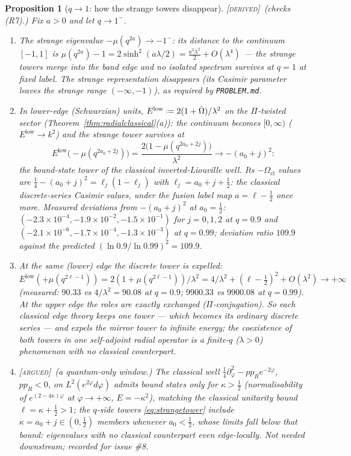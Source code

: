 \documentclass[11pt,a4paper]{article}
\providecommand{\coloneqq}{\mathrel{\vcenter{\baselineskip0.5ex \lineskiplimit0pt
      \hbox{\scriptsize.}\hbox{\scriptsize.}}}=}
\newcommand{\DERIVED}{{\color{teal}\textsc{[derived]}}}
\newcommand{\ARGUED}{{\color{orange}\textsc{[argued]}}}
\theoremstyle{definition}
\theoremstyle{plain}
\newtheorem{proposition}[definition]{Proposition}
\newcommand{\Cas}{\Omega}                       %
\newcommand{\tCas}{\tilde\Omega}                %
\begin{document}
\begin{proposition}[$q\to1$: how the strange towers disappear]\label{prop:radialq1}
\DERIVED\ (checks (R7).) Fix $a>0$ and let $q\to1^{-}$.
\begin{enumerate}[label=(\roman*)]
\item The strange eigenvalue $-\mu(q^{2a})\to-1^{-}$: its distance to the continuum
$[-1,1]$ is $\mu(q^{2a})-1=2\sinh^{2}(a\lambda/2)=\tfrac{a^{2}\lambda^{2}}{2}+O(\lambda^{4})$
--- the strange towers merge into the band edge and no isolated spectrum survives at $q=1$
at fixed label. The strange \emph{representation} disappears (its Casimir parameter leaves
the strange range $(-\infty,-1)$), as required by \texttt{PROBLEM.md}.
\item In lower-edge (Schwarzian) units, $E^{\mathrm{low}}\coloneqq2(1+\tCas)/\lambda^{2}$
on the $\Pi$-twisted sector (Theorem~\ref{thm:radialclassical}(a)): the continuum becomes
$[0,\infty)$ ($E^{\mathrm{low}}\to k^{2}$) and the strange tower survives at
\begin{equation}\label{eq:strangetower}
  E^{\mathrm{low}}\bigl(-\mu(q^{2a_{0}+2j})\bigr)
  =\frac{2\bigl(1-\mu(q^{2a_{0}+2j})\bigr)}{\lambda^{2}}
  \longrightarrow -(a_{0}+j)^{2}:
\end{equation}
the bound-state tower of the classical inverted-Liouville well. Its $-\Cas_{\mathrm{cl}}$
values are $\tfrac14-(a_{0}+j)^{2}=\ell_j(1-\ell_j)$ with $\ell_j=a_{0}+j+\tfrac12$: the
\emph{classical discrete-series} Casimir values, under the fusion label map
$a=\ell-\tfrac12$ once more. Measured deviations from $-(a_{0}+j)^{2}$ at
$a_{0}=\tfrac12$: $(-2.3\times10^{-4},-1.9\times10^{-2},-1.5\times10^{-1})$ for $j=0,1,2$
at $q=0.9$ and $(-2.1\times10^{-6},-1.7\times10^{-4},-1.3\times10^{-3})$ at $q=0.99$;
deviation ratio $109.9$ against the predicted $(\ln0.9/\ln0.99)^{2}=109.9$.
\item At the same (lower) edge the \emph{discrete} tower is expelled:
$E^{\mathrm{low}}(+\mu(q^{2\ell-1}))=2(1+\mu(q^{2\ell-1}))/\lambda^{2}
=4/\lambda^{2}+(\ell-\tfrac12)^{2}+O(\lambda^{2})\to+\infty$ (measured: $90.33$ vs
$4/\lambda^{2}=90.08$ at $q=0.9$; $9900.33$ vs $9900.08$ at $q=0.99$). At the upper edge
the roles are exactly exchanged ($\Pi$-conjugation). So each classical edge theory keeps
one tower --- which becomes its ordinary discrete series --- and expels the mirror tower to
infinite energy; the coexistence of both towers in one self-adjoint radial operator is a
finite-$q$ ($\lambda>0$) phenomenon with no classical counterpart.
\item \ARGUED\ \emph{(a quantum-only window.)} The classical well
$\tfrac14\partial^{2}_{\varphi}-pp_{R}e^{-2\varphi}$, $pp_{R}<0$, on
$L^{2}(e^{2\varphi}d\varphi)$ admits bound states only for $\kappa>\tfrac12$
(normalisability of $e^{(2-4\kappa)\varphi}$ at $\varphi\to+\infty$, $E=-\kappa^{2}$),
matching the classical unitarity bound $\ell=\kappa+\tfrac12>1$; the $q$-side towers
\eqref{eq:strangetower} include $\kappa=a_{0}+j\in(0,\tfrac12)$ members whenever
$a_{0}<\tfrac12$, whose limits fall below that bound: eigenvalues with no classical
counterpart even edge-locally. Not needed downstream; recorded for issue \#8.
\end{enumerate}
\end{proposition}
\end{document}
